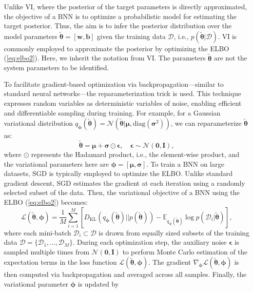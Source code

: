 Unlike \ac{VI}, where the posterior of the target parameters is directly approximated, the objective of a \ac{BNN} is to optimize a probabilistic model for estimating the target posterior. Thus, the aim is to infer the posterior distribution over the model parameters $\tilde{\boldsymbol{\theta}}=[\boldsymbol{w}, \boldsymbol{b}]$ given the training data $\mathcal{D}$, i.e., $p(\tilde{\boldsymbol{\theta}}|\mathcal{D})$. \ac{VI} is commonly employed to approximate the posterior by optimizing the \ac{ELBO} (\ref{eq:elbo2}). Here, we inherit the notation from \ac{VI}. The parameters $\tilde{\boldsymbol{\theta}}$ are not the system parameters to be identified.

To facilitate gradient-based optimization via backpropagation---similar to standard neural networks---the reparameterization trick \citep{kingma2013auto} is used. This technique expresses random variables as deterministic variables of noise, enabling efficient and differentiable sampling during training. For example, for a Gaussian variational distribution $q_{\boldsymbol{\phi}}(\tilde{\boldsymbol{\theta}})=\mathcal{N}(\tilde{\boldsymbol{\theta}}|\boldsymbol{\mu}, \text{diag}(\boldsymbol{\sigma}^2))$, we can reparameterize $\tilde{\boldsymbol{\theta}}$ as:  
\begin{equation}
    \tilde{\boldsymbol{\theta}} = \boldsymbol{\mu} + \boldsymbol{\sigma} \odot \boldsymbol{\epsilon}, \quad \boldsymbol{\epsilon}\sim\mathcal{N}(\boldsymbol{0}, \boldsymbol{I}),
\end{equation}  
where $\odot$ represents the Hadamard product, i.e., the element-wise product, and the variational parameters here are $\boldsymbol{\phi}=[\boldsymbol{\mu}, \boldsymbol{\sigma}]$. 
To train a \ac{BNN} on large datasets, \ac{SGD} \citep{bottou1999sgd} is typically employed to optimize the \ac{ELBO}. Unlike standard gradient descent, \ac{SGD} estimates the gradient at each iteration using a randomly selected subset of the data. Then, the variational objective of a \ac{BNN} using the \ac{ELBO} (\ref{eq:elbo2}) becomes:
\begin{equation}
    \mathcal{L}(\tilde{\boldsymbol{\theta}}, \boldsymbol{\phi}) = \frac{1}{M}\sum_{i=1}^{M} [D_{\text{KL}}(q_{\boldsymbol{\phi}}(\tilde{\boldsymbol{\theta}})||p(\tilde{\boldsymbol{\theta}}))-\mathbb{E}_{q_{\boldsymbol{\phi}}(\tilde{\boldsymbol{\theta}})}\log p(\mathcal{D}_i|\tilde{\boldsymbol{\theta}})],
\end{equation}
where each mini-batch $\mathcal{D}_i\subset\mathcal{D}$ is drawn from equally sized subsets of the training data $\mathcal{D}=\{\mathcal{D}_1,\dots,\mathcal{D}_M\}$. During each optimization step, the auxiliary noise $\boldsymbol{\epsilon}$ is sampled multiple times from $\mathcal{N}(\boldsymbol{0}, \boldsymbol{I})$ to perform Monte Carlo estimation of the expectation terms in the loss function $\mathcal{L}(\tilde{\boldsymbol{\theta}}, \boldsymbol{\phi})$. The gradient $\nabla_{\boldsymbol{\phi}}\mathcal{L}(\tilde{\boldsymbol{\theta}}, \boldsymbol{\phi})$ is then computed via backpropagation and averaged across all samples. Finally, the variational parameter $\boldsymbol{\phi}$ is updated by 
